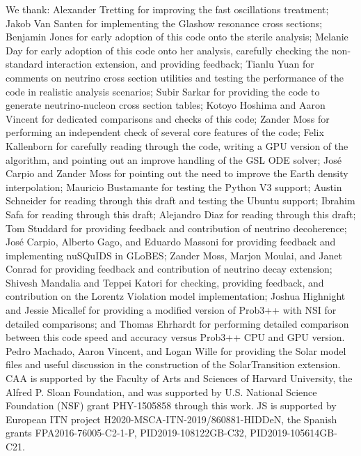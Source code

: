 \documentclass[3p,12pt]{elsarticle}
\begin{document}
We thank: Alexander Tretting for improving the fast oscillations treatment;
Jakob Van Santen for implementing the Glashow resonance cross sections;
Benjamin Jones for early adoption of this code onto the sterile analysis;
Melanie Day for early adoption of this code onto her analysis, carefully checking the non-standard interaction extension, and providing feedback;
Tianlu Yuan for comments on neutrino cross section utilities and testing the performance of the code in realistic analysis scenarios;
Subir Sarkar for providing the code to generate neutrino-nucleon cross section tables;
Kotoyo Hoshima and Aaron Vincent for dedicated comparisons and checks of this code;
Zander Moss for performing an independent check of several core features of the code;
Felix Kallenborn for carefully reading through the code, writing a GPU version of the algorithm, and pointing out an improve handling of the GSL ODE solver;
Jos\'e Carpio and Zander Moss for pointing out the need to improve the Earth density interpolation;
Mauricio Bustamante for testing the Python V3 support;
Austin Schneider for reading through this draft and testing the Ubuntu support;
Ibrahim Safa for reading through this draft;
Alejandro Diaz for reading through this draft;
Tom Studdard for providing feedback and contribution of neutrino decoherence;
Jos\'e Carpio, Alberto Gago, and Eduardo Massoni for providing feedback and implementing nuSQuIDS in GLoBES;
Zander Moss, Marjon Moulai, and Janet Conrad for providing feedback and contribution of neutrino decay extension;
Shivesh Mandalia and Teppei Katori for checking, providing feedback, and contribution on the Lorentz Violation model implementation;
Joshua Highnight and Jessie Micallef for providing a modified version of Prob3++ with NSI for detailed comparisons; and
Thomas Ehrhardt for performing detailed comparison between this code speed and accuracy versus Prob3++ CPU and GPU version.
Pedro Machado, Aaron Vincent, and Logan Wille for providing the Solar model files and useful discussion in the construction of the SolarTransition extension.
CAA is supported by the Faculty of Arts and Sciences of Harvard University, the Alfred P. Sloan Foundation, and was supported by U.S. National Science Foundation (NSF) grant PHY-1505858 through this work.
JS is supported by  European ITN project H2020-MSCA-ITN-2019/860881-HIDDeN, the Spanish grants FPA2016-76005-C2-1-P, 
PID2019-108122GB-C32, PID2019-105614GB-C21.


\ifdefined\forjournal

\else

\fi %
\fi %
\end{document}
